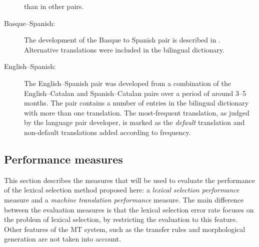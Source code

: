 \documentclass[11pt]{article}
\newcommand{\comment}[1]{\todo{#1}}
\begin{document}
\begin{description}
than in other pairs.  
\item[Basque--Spanish:] The development of the Basque to Spanish pair
  is described in \cite{ginesti09}. 
  Alternative translations were included in the bilingual
  dictionary.%

\item[English--Spanish:] The English--Spanish pair was developed from
  a combination of the English--Catalan and Spanish--Catalan pairs
  over a period of around 3--5 months. The pair 
  contains a number of entries in the bilingual dictionary with
  more than one translation. The most-frequent translation, as judged
  by the language pair developer, is marked as the \emph{default}
  translation and non-default translations added according to
  frequency. 
\end{description}


\subsection{Performance measures}
\label{ss:measures}

This section describes the measures that will be used to evaluate the
performance of the lexical selection method proposed here: a
\emph{lexical selection performance} measure and a \emph{machine
  translation performance} measure. The main difference between the
evaluation measures is that the lexical selection error rate focuses on 
the problem of lexical selection, by restricting the evaluation to
this feature. Other features of the MT system, such as the transfer rules
and morphological generation are not taken into account.
\end{document}
